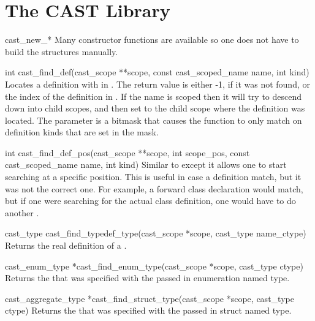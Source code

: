

\section{The CAST Library}
\label{sec:CAST:The CAST Library}

\begin{cprototypelist}
  \item[cast_new_*] Many constructor functions are available so
  one does not have to build the structures manually.

  \item[int cast_find_def(cast_scope **scope, const
  cast_scoped_name name, int kind)] Locates a definition with
   in .  The return value is either -1, if
  it was not found, or the index of the definition in .  If
  the name is scoped then it will try to descend down into child scopes, and
  then set  to the child scope where the definition was
  located.  The  parameter is a bitmask that causes the
  function to only match on definition kinds that are set in the mask.

  \item[int cast_find_def_pos(cast_scope **scope, int scope_pos,
  					  const cast_scoped_name name,
					  int kind)]
  Similar to  except it allows one to start searching
  at a specific position.  This is useful in case a definition match, but it
  was not the correct one.  For example, a forward class declaration would
  match, but if one were searching for the actual class definition, one would
  have to do another .

  \item[cast_type cast_find_typedef_type(cast_scope *scope,
  cast_type name_ctype)] Returns the real definition of a
  .

  \item[cast_enum_type *cast_find_enum_type(cast_scope *scope,
  cast_type ctype)] Returns the  that was specified with
  the passed in enumeration named type.

  \item[cast_aggregate_type *cast_find_struct_type(cast_scope
  *scope, cast_type ctype)] Returns the  that was
  specified with the passed in struct named type.


\end{cprototypelist}
